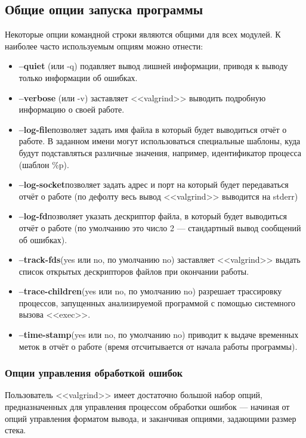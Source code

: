 \documentclass[12pt]{article}
\begin{document}
\subsection*{Общие опции запуска программы}
Некоторые опции командной строки являются общими для всех модулей. К наиболее часто используемым опциям можно отнести:
\begin{itemize}
	\item {\bf --quiet} (или -q) подавляет вывод лишней информации, приводя к выводу только информации об ошибках.
	\item {\bf --verbose} (или -v) заставляет <<valgrind>> выводить подробную информацию о своей работе.
	
	\item {\bf --log-file}\subitem позволяет задать имя файла в который будет выводиться отчёт о работе. В заданном имени могут использоваться специальные шаблоны, куда будут подставляться различные значения, например, идентификатор процесса (шаблон \%p).
	\item {\bf --log-socket}\subitem позволяет задать адрес и порт на который будет передаваться отчёт о работе (по дефолту весь вывод <<valgrind>> выводится на stderr)
	\item {\bf --log-fd}\subitem позволяет указать дескриптор файла, в который будет выводиться отчёт о работе (по умолчанию это число 2 — стандартный вывод сообщений об ошибках).
	
	\item {\bf --track-fds}\subitem (yes или no, по умолчанию no) заставляет <<valgrind>> выдать список открытых дескрипторов файлов при окончании работы.
	\item {\bf --trace-children}\subitem (yes или no, по умолчанию no) разрешает трассировку процессов, запущенных анализируемой программой с помощью системного вызова <<exec>>.
	\item {\bf --time-stamp}\subitem (yes или no, по умолчанию no) приводит к выдаче временных меток в отчёт о работе (время отсчитывается от начала работы программы).
	
\end{itemize}

\subsubsection*{Опции управления обработкой ошибок}

Пользователь <<valgrind>> имеет достаточно большой набор опций, предназначенных для управления процессом обработки ошибок — начиная от опций управления форматом вывода, и заканчивая опциями, задающими размер стека.
\end{document}
